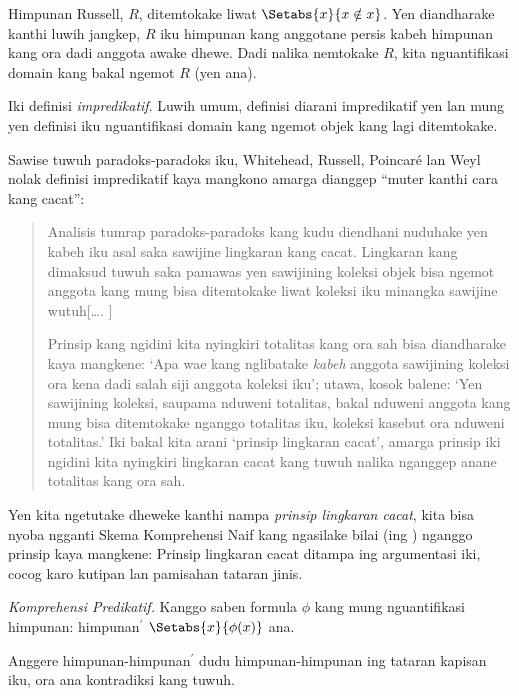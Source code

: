 \documentclass[../../../include/open-logic-section]{subfiles}
\begin{document}


Himpunan Russell, $R$, ditemtokake liwat $\Setabs{x}{x \notin
x}$. Yen diandharake kanthi luwih jangkep, $R$ iku himpunan
kang anggotane persis kabeh himpunan kang ora dadi anggota
awake dhewe. Dadi nalika nemtokake $R$, kita nguantifikasi
domain kang bakal ngemot $R$ (yen ana).

Iki definisi \emph{impredikatif}. Luwih umum, definisi diarani
impredikatif yen lan mung yen definisi iku nguantifikasi domain
kang ngemot objek kang lagi ditemtokake.
	
Sawise tuwuh paradoks-paradoks iku, Whitehead, Russell,
Poincar\'{e} lan Weyl nolak definisi impredikatif kaya mangkono
amarga dianggep ``muter kanthi cara kang cacat'':
\begin{quote}
	Analisis tumrap paradoks-paradoks kang kudu diendhani nuduhake
	yen kabeh iku asal saka sawijine lingkaran kang cacat.
	Lingkaran kang dimaksud tuwuh saka pamawas yen sawijining
	koleksi objek bisa ngemot anggota kang mung bisa ditemtokake
	liwat koleksi iku minangka sawijine wutuh[\ldots. \textparagraph]

	Prinsip kang ngidini kita nyingkiri totalitas kang ora sah
	bisa diandharake kaya mangkene: `Apa wae kang nglibatake
	\emph{kabeh} anggota sawijining koleksi ora kena dadi
	salah siji anggota koleksi iku'; utawa, kosok balene:
	`Yen sawijining koleksi, saupama nduweni totalitas,
	bakal nduweni anggota kang mung bisa ditemtokake nganggo
	totalitas iku, koleksi kasebut ora nduweni totalitas.'
	Iki bakal kita arani `prinsip lingkaran cacat', amarga
	prinsip iki ngidini kita nyingkiri lingkaran cacat kang
	tuwuh nalika nganggep anane totalitas kang ora sah.
	\citep[p.~37]{WhiteheadRussell1910}
\end{quote}
Yen kita ngetutake dheweke kanthi nampa \emph{prinsip lingkaran
cacat}, kita bisa nyoba ngganti Skema Komprehensi Naif kang
ngasilake bilai (ing ) nganggo
prinsip kaya mangkene:
Prinsip lingkaran cacat ditampa ing argumentasi iki, cocog karo kutipan lan pamisahan tataran jinis.

\begin{defish}
\emph{Komprehensi Predikatif.} Kanggo saben formula $\phi$ kang
mung nguantifikasi himpunan: himpunan$^\prime$ $\Setabs{x}{\phi(x)}$
ana.
\end{defish}

Anggere himpunan-himpunan$^{\prime}$ dudu himpunan-himpunan
ing tataran kapisan iku, ora ana kontradiksi kang tuwuh.
\end{document}
